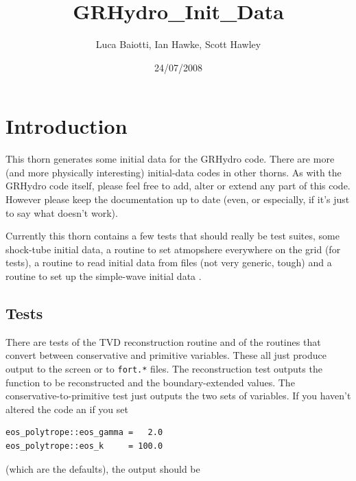 \documentclass{article}
\begin{document}
\title{GRHydro\_Init\_Data}
\author{Luca Baiotti, Ian Hawke, Scott Hawley}
\date{24/07/2008}
\maketitle


\section{Introduction}
\label{sec:intro}

This thorn generates some initial data for the GRHydro code. There are more (and more physically
interesting) initial-data codes in other thorns. As with the GRHydro code itself, please feel free to
add, alter or extend any part of this code. However please keep the documentation up to date (even,
or especially, if it's just to say what doesn't work).

Currently this thorn contains a few tests that should really be test suites, some shock-tube
initial data, 
a routine to set atmopshere everywhere on the
grid (for tests), a routine to read initial data from files (not very generic, tough) and a routine
to set up the simple-wave initial data .


\subsection{Tests}
\label{sec:tests}

There are tests of the TVD reconstruction routine and of the routines
that convert between conservative and primitive variables. These all
just produce output to the screen or to {\tt fort.*} files. The
reconstruction test outputs the function to be reconstructed and the
boundary-extended values. The conservative-to-primitive test just
outputs the two sets of variables. If you haven't altered the code an if you set
\begin{verbatim}
eos_polytrope::eos_gamma =   2.0
eos_polytrope::eos_k     = 100.0
\end{verbatim}
(which are the defaults), the output should be
\end{document}
